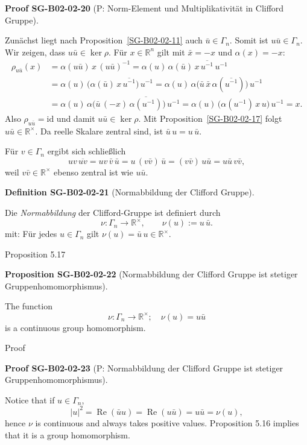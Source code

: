 \documentclass[10pt, letterpaper]{article}
\newcommand{\R}{\mathbb{R}}
\newcommand{\CustomHeading}[3]{%
  \par\medskip\noindent%
  \textbf{#1 #2} \textnormal{(#3)}.\enskip%
}
\newenvironment{DEF}[2]{\begin{unitbox}\CustomHeading{Definition}{#1}{#2}}{\end{unitbox}}
\newenvironment{PROP}[2]{\begin{unitbox}\CustomHeading{Proposition}{#1}{#2}}{\end{unitbox}}
\newenvironment{PROOF}[2]{\begin{unitbox}\CustomHeading{Proof}{#1}{#2}}{\end{unitbox}}
\begin{document}
\begin{PROOF}{SG-B02-02-20}{P: Norm-Element und Multiplikativität in Clifford Gruppe}
Zunächst liegt nach Proposition~\ref{SG-B02-02-11} auch \(\bar u \in \Gamma_n\). Somit ist \(u\bar u \in \Gamma_n\).
Wir zeigen, dass \(u\bar u \in \ker \rho\). Für \(x \in \R^n\) gilt mit \(\bar x = -x\) und \(\alpha(x)=-x\):
\begin{align*}
\rho_{u\bar u}(x)
&= \alpha(u\bar u)\, x\, (u\bar u)^{-1}
 = \alpha(u)\,\alpha(\bar u)\, x \, \overline{u^{-1}}\, u^{-1} \\
&= \alpha(u)\,\big(\alpha(\bar u)\, x \, \overline{u^{-1}}\big)\,u^{-1}
 = \alpha(u)\,\alpha\!\big(\bar u\,\bar x\, \alpha(\overline{u^{-1}})\big)\,u^{-1} \\
&= \alpha(u)\,\alpha\!\big(\bar u\,(-x)\,\overline{\alpha(u^{-1})}\big)\,u^{-1}
 = \alpha(u)\,\big(\alpha(u^{-1})\, x \, u\big)\,u^{-1}
 = x.
\end{align*}
Also \(\rho_{u\bar u}=\mathrm{id}\) und damit \(u\bar u \in \ker\rho\). Mit Proposition~\ref{SG-B02-02-17} folgt
\(u\bar u \in \R^{\times}\). Da reelle Skalare zentral sind, ist \(\bar u\,u = u\,\bar u\).

Für \(v \in \Gamma_n\) ergibt sich schließlich
\[
uv\,\overline{uv}
 = uv\,\bar v\,\bar u
 = u\,(v\bar v)\,\bar u
 = (v\bar v)\,u\bar u
 = u\bar u\, v\bar v,
\]
weil \(v\bar v \in \R^{\times}\) ebenso zentral ist wie \(u\bar u\).
\end{PROOF}



\begin{DEF}{SG-B02-02-21}{Normabbildung der Clifford Gruppe}
Die \emph{Normabbildung} der Clifford-Gruppe ist definiert durch
\[
\nu : \Gamma_n \longrightarrow \R^{\times}, 
\qquad 
\nu(u) := u\,\bar u.
\]
mit: Für jedes \(u \in \Gamma_n\) gilt \(\nu(u) = \bar u\,u \in \R^{\times}\).
\end{DEF}



Proposition 5.17


\begin{PROP}{SG-B02-02-22}{Normabbildung der Clifford Gruppe ist stetiger Gruppenhomomorphismus}
The function
$$
\nu: \Gamma_{n} \longrightarrow \mathbb{R}^{\times} ; \quad \nu(u)=u \bar{u}
$$
is a continuous group homomorphism.
\end{PROP}




Proof

\begin{PROOF}{SG-B02-02-23}{P: Normabbildung der Clifford Gruppe ist stetiger Gruppenhomomorphismus}
Notice that if $u \in \Gamma_{n}$,
$$
|u|^{2}=\operatorname{Re}(\bar{u} u)=\operatorname{Re}(u \bar{u})=u \bar{u}=\nu(u),
$$
hence $\nu$ is continuous and always takes positive values. Proposition 5.16 implies that it is a group homomorphism.
\end{PROOF} 
\end{document}
